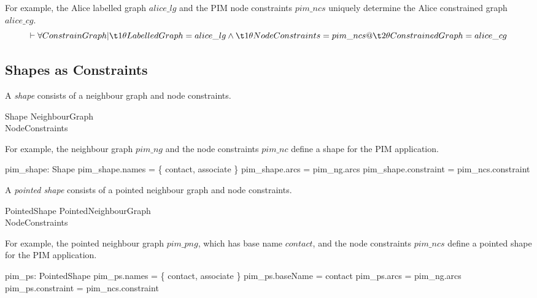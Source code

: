 \documentclass{article}
\begin{document}
For example, the Alice labelled graph $alice\_lg$ and the PIM node constraints $pim\_ncs$ uniquely determine the
Alice constrained graph $alice\_cg$.
\[\vdash
	\forall ConstrainGraph | \\
\t1		\theta LabelledGraph = alice\_lg \land \\
\t1		\theta NodeConstraints = pim\_ncs @ \\
\t2			\theta ConstrainedGraph = alice\_cg
\]

\subsection{Shapes as Constraints}

A {\em shape} consists of a neighbour graph and node constraints.
\begin{schema}{Shape}
	NeighbourGraph \\
	NodeConstraints
\end{schema}

For example, the neighbour graph $pim\_ng$ and the node constraints $pim\_nc$ define a shape for the PIM application.
\begin{axdef}
	pim\_shape: Shape
\where
	pim\_shape.names = \{ contact, associate \}
\also
	pim\_shape.arcs = pim\_ng.arcs
\also
	pim\_shape.constraint = pim\_ncs.constraint
\end{axdef}		

A {\em pointed shape} consists of a pointed neighbour graph and node constraints.
\begin{schema}{PointedShape}
	PointedNeighbourGraph \\
	NodeConstraints
\end{schema}

For example, the pointed neighbour graph $pim\_png$, which has base name $contact$, and the node constraints
$pim\_ncs$ define a pointed shape for the PIM application.
\begin{axdef}
	pim\_ps: PointedShape
\where
	pim\_ps.names = \{ contact, associate \}
\also
	pim\_ps.baseName = contact
\also
	pim\_ps.arcs = pim\_ng.arcs
\also
	pim\_ps.constraint = pim\_ncs.constraint
\end{axdef}		
\end{document}
